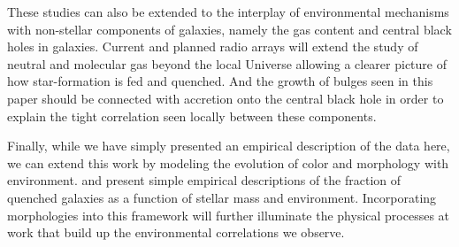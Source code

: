 These studies can also be extended to the interplay of environmental
mechanisms with non-stellar components of galaxies, namely the gas
content and central black holes in galaxies. Current and planned radio
arrays will extend the study of neutral and molecular gas beyond the
local Universe allowing a clearer picture of how star-formation is fed and
quenched. And the growth of bulges seen in this paper should be
connected with accretion onto the central black hole in order to
explain the tight correlation seen locally between these components.

Finally, while we have simply presented an empirical description of
the data here, we can extend this work by modeling the evolution of
color and morphology with environment. \citet{Peng2010} and
\citet{Wetzel2012b} present simple empirical descriptions of the
fraction of quenched galaxies as a function of stellar mass and
environment. Incorporating morphologies into this framework will
further illuminate the physical processes at work that build up the
environmental correlations we observe.
